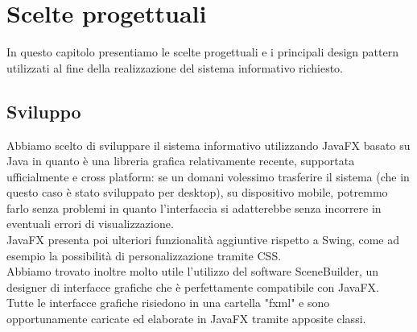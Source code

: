 \documentclass[a4paper,11pt]{report}
\begin{document}
\clearpage

\chapter{Scelte progettuali}
In questo capitolo presentiamo le scelte progettuali e i principali design pattern utilizzati al fine della realizzazione del sistema informativo richiesto.\\
\section{Sviluppo}
Abbiamo scelto di sviluppare il sistema informativo utilizzando JavaFX basato su Java in quanto è una libreria grafica relativamente recente, supportata ufficialmente e cross platform: se un domani volessimo trasferire il sistema (che in questo caso è stato sviluppato per desktop), su dispositivo mobile, potremmo farlo senza problemi in quanto l'interfaccia si adatterebbe senza incorrere in eventuali errori di visualizzazione.\\
JavaFX presenta poi ulteriori funzionalità aggiuntive rispetto a Swing, come ad esempio la possibilità di personalizzazione tramite CSS.\\
Abbiamo trovato inoltre molto utile l'utilizzo del software SceneBuilder, un designer di interfacce grafiche che è perfettamente compatibile con JavaFX.\\ Tutte le interfacce grafiche risiedono in una cartella "fxml" e sono opportunamente caricate ed elaborate in JavaFX tramite apposite classi.\\

\clearpage
\end{document}
